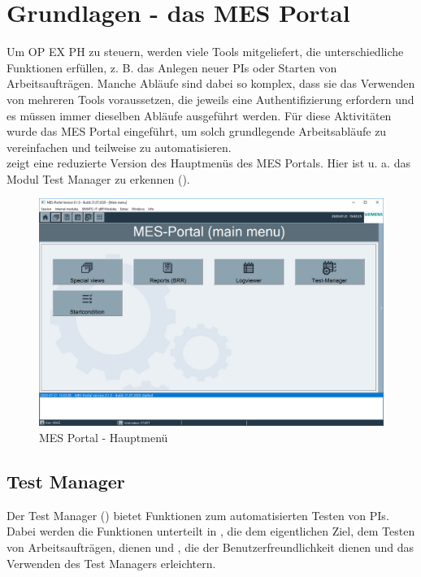 
\chapter{Grundlagen - das MES Portal}
Um \gls{OP EX PH} zu steuern, werden viele Tools mitgeliefert, die unterschiedliche Funktionen erfüllen, z. B. das Anlegen neuer \glspl{PI} oder Starten von Arbeitsaufträgen. Manche Abläufe sind dabei so komplex, dass sie das Verwenden von mehreren Tools voraussetzen, die jeweils eine Authentifizierung erfordern und es müssen immer dieselben Abläufe ausgeführt werden. Für diese Aktivitäten wurde das MES Portal eingeführt, um solch grundlegende Arbeitsabläufe zu vereinfachen und teilweise zu automatisieren.\\
 zeigt eine reduzierte Version des Hauptmenüs des MES Portals. Hier ist u. a. das Modul Test Manager zu erkennen ().

\begin{figure}[htbp]
  \centering
  \includegraphics[width=.7\textwidth]{img/mes-portal_overview}
  \caption{\label{fig-mes_portal_overview}MES Portal - Hauptmenü}
\end{figure}

\section{Test Manager}\label{sec-test_manager}
Der Test Manager () bietet Funktionen zum automatisierten Testen von \glspl{PI}. Dabei werden die Funktionen unterteilt in \textbf{}, die dem eigentlichen Ziel, dem Testen von Arbeitsaufträgen, dienen und \textbf{}, die der Benutzerfreundlichkeit dienen und das Verwenden des Test Managers erleichtern.

